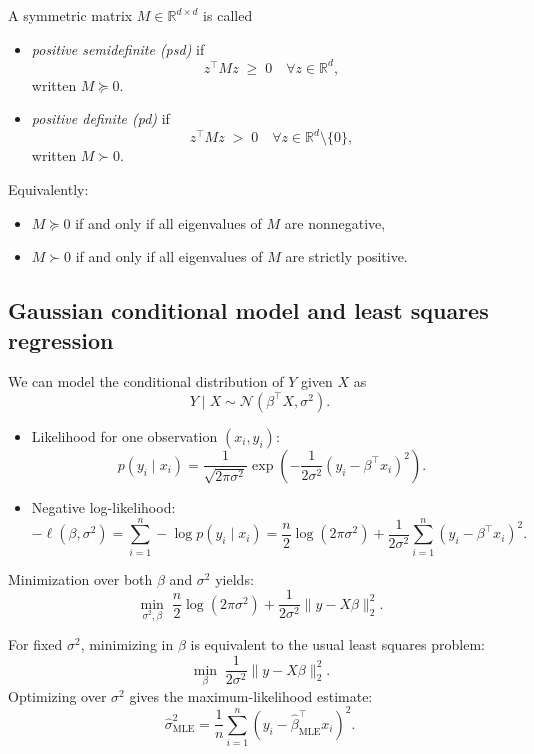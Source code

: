 \begin{remark}
A symmetric matrix $M \in \mathbb{R}^{d\times d}$ is called
\begin{itemize}
  \item \emph{positive semidefinite (psd)} if
  \[
  z^\top M z \;\geq\; 0 \quad \forall z \in \mathbb{R}^d,
  \]
  written $M \succeq 0$.
  \item \emph{positive definite (pd)} if
  \[
  z^\top M z \;>\; 0 \quad \forall z \in \mathbb{R}^d\setminus\{0\},
  \]
  written $M \succ 0$.
\end{itemize}
Equivalently:
\begin{itemize}
  \item $M\succeq 0$ if and only if all eigenvalues of $M$ are nonnegative,
  \item $M\succ 0$ if and only if all eigenvalues of $M$ are strictly positive.
\end{itemize}
\end{remark}

\subsection*{Gaussian conditional model and least squares regression}

We can model the conditional distribution of $Y$ given $X$ as
\[
Y \mid X \sim \mathcal{N}(\beta^\top X, \sigma^2).
\]

\begin{itemize}
  \item Likelihood for one observation $(x_i,y_i)$:
  \[
  p(y_i \mid x_i) = \frac{1}{\sqrt{2\pi\sigma^2}}
  \exp\!\left(-\frac{1}{2\sigma^2}(y_i - \beta^\top x_i)^2\right).
  \]

  \item Negative log-likelihood:
  \[
  -\ell(\beta,\sigma^2) = 
  \sum_{i=1}^n -\log p(y_i\mid x_i)
  = \frac{n}{2}\log(2\pi\sigma^2) 
  + \frac{1}{2\sigma^2}\sum_{i=1}^n (y_i - \beta^\top x_i)^2.
  \]
\end{itemize}

\medskip

\noindent Minimization over both $\beta$ and $\sigma^2$ yields:
\[
\min_{\sigma^2,\beta} \; 
\frac{n}{2}\log(2\pi\sigma^2) 
+ \frac{1}{2\sigma^2}\|y - X\beta\|_2^2.
\]

\begin{remark}
For fixed $\sigma^2$, minimizing in $\beta$ is equivalent to the
usual least squares problem:
\[
\min_{\beta} \; \frac{1}{2\sigma^2}\|y - X\beta\|_2^2.
\]
Optimizing over $\sigma^2$ gives the maximum-likelihood estimate:
\[
\hat\sigma^2_{\mathrm{MLE}} = \frac{1}{n}\sum_{i=1}^n (y_i - \hat\beta^\top_{\mathrm{MLE}} x_i)^2.
\]
\end{remark}


